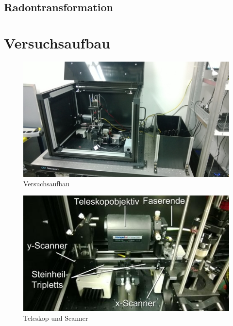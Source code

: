 \subsection{Radontransformation}

\section{Versuchsaufbau}
\begin{minipage}{\linewidth}
\begin{figure}[H]
	\centering
\includegraphics[width=1.0\linewidth]{IMAGE/versuchsaufbau.png}
	\caption{Versuchsaufbau}
	\label{fig:versuchsaufbau}
\end{figure} 

\begin{figure}[H]
	\centering
\includegraphics[width=1.0\linewidth]{IMAGE/scanner.jpeg}
	\caption{Teleskop und Scanner}
	\label{fig:scanner}
\end{figure}

\end{minipage}

